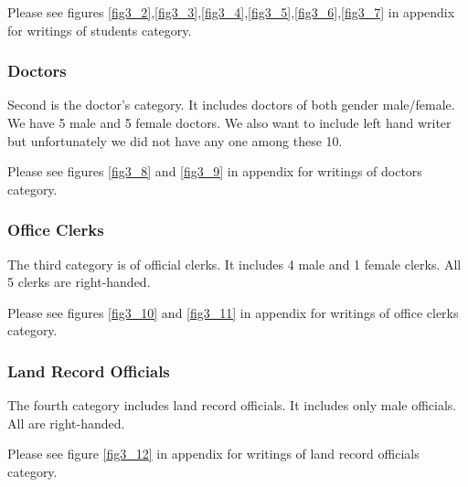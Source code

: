 

Please see figures \ref{fig3_2},\ref{fig3_3},\ref{fig3_4},\ref{fig3_5},\ref{fig3_6},\ref{fig3_7} in appendix for writings of students category. 

\subsubsection{Doctors}
Second is the doctor’s category. It includes doctors of both gender male/female. We have 5 male and 5 female doctors. We also want to include left hand writer but unfortunately we did not have any one among these 10.


Please see figures \ref{fig3_8} and \ref{fig3_9} in appendix for writings of doctors category. 
\subsubsection{Office Clerks}
The third category is of official clerks. It includes 4 male and 1 female clerks. All 5 clerks are right-handed.




Please see figures \ref{fig3_10} and \ref{fig3_11} in appendix for writings of office clerks category. 
\subsubsection{Land Record Officials}

The fourth category includes land record officials. It includes only male officials. All are right-handed.

Please see figure \ref{fig3_12} in appendix for writings of land record officials category.
